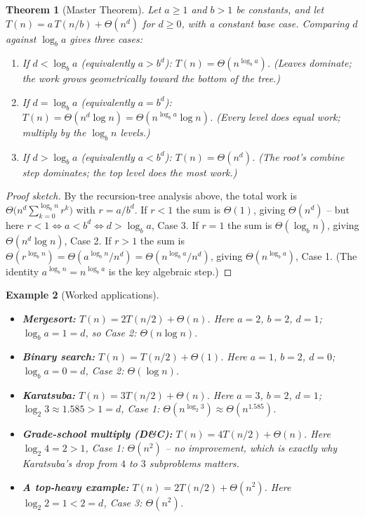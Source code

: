 \documentclass[11pt]{article}
\newtheorem{theorem}{Theorem}[section]
\newtheorem{example}[theorem]{Example}
\begin{document}
\begin{theorem}[Master Theorem]
\label{thm:master}
Let $a \ge 1$ and $b > 1$ be constants, and let $T(n) = a\,T(n/b) + \Theta(n^d)$ for $d \ge
0$, with a constant base case. Comparing $d$ against $\log_b a$ gives three cases:
\begin{enumerate}[label=\textbf{Case \arabic*.}]
    \item If $d < \log_b a$ (equivalently $a > b^d$): \quad $T(n) = \Theta\!\left(n^{\log_b a}\right)$.
    \emph{(Leaves dominate; the work grows geometrically toward the bottom of the tree.)}
    \item If $d = \log_b a$ (equivalently $a = b^d$): \quad $T(n) = \Theta\!\left(n^{d} \log n\right)
    = \Theta\!\left(n^{\log_b a} \log n\right)$.
    \emph{(Every level does equal work; multiply by the $\log_b n$ levels.)}
    \item If $d > \log_b a$ (equivalently $a < b^d$): \quad $T(n) = \Theta\!\left(n^{d}\right)$.
    \emph{(The root's combine step dominates; the top level does the most work.)}
\end{enumerate}
\end{theorem}

\begin{proof}[Proof sketch]
By the recursion-tree analysis above, the total work is
$\Theta\!\bigl(n^d \sum_{k=0}^{\log_b n} r^k\bigr)$ with $r = a/b^d$. If $r < 1$ the sum is
$\Theta(1)$, giving $\Theta(n^d)$ -- but here $r<1 \iff a < b^d \iff d > \log_b a$, Case 3.
If $r = 1$ the sum is $\Theta(\log_b n)$, giving $\Theta(n^d \log n)$, Case 2. If $r > 1$
the sum is $\Theta(r^{\log_b n}) = \Theta(a^{\log_b n}/n^d) = \Theta(n^{\log_b a}/n^d)$,
giving $\Theta(n^{\log_b a})$, Case 1. (The identity $a^{\log_b n} = n^{\log_b a}$ is the
key algebraic step.)
\end{proof}

\begin{example}[Worked applications]
\hfill
\begin{itemize}
    \item \textbf{Mergesort:} $T(n) = 2T(n/2) + \Theta(n)$. Here $a=2$, $b=2$, $d=1$;
    $\log_b a = 1 = d$, so Case 2: $\Theta(n \log n)$.
    \item \textbf{Binary search:} $T(n) = T(n/2) + \Theta(1)$. Here $a=1$, $b=2$, $d=0$;
    $\log_b a = 0 = d$, Case 2: $\Theta(\log n)$.
    \item \textbf{Karatsuba:} $T(n) = 3T(n/2) + \Theta(n)$. Here $a=3$, $b=2$, $d=1$;
    $\log_2 3 \approx 1.585 > 1 = d$, Case 1: $\Theta(n^{\log_2 3}) \approx \Theta(n^{1.585})$.
    \item \textbf{Grade-school multiply (D\&C):} $T(n) = 4T(n/2) + \Theta(n)$. Here
    $\log_2 4 = 2 > 1$, Case 1: $\Theta(n^2)$ -- no improvement, which is exactly why
    Karatsuba's drop from $4$ to $3$ subproblems matters.
    \item \textbf{A top-heavy example:} $T(n) = 2T(n/2) + \Theta(n^2)$. Here $\log_2 2 = 1 <
    2 = d$, Case 3: $\Theta(n^2)$.
\end{itemize}
\end{example}
\end{document}
